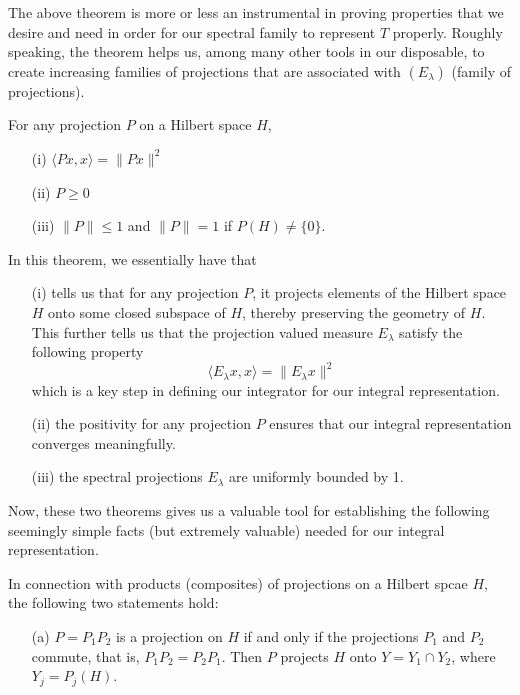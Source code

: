 The above theorem is more or less an instrumental in proving properties that we desire and need in order for our spectral family to represent \( T  \) properly. Roughly speaking, the theorem helps us, among many other tools in our disposable, to create increasing families of projections that are associated with \( ({E}_{\lambda}) \) (family of projections).

\begin{theorem}\label{9.5-2} For any projection \( P  \) on a Hilbert space \( H  \), 
   \begin{enumerate}
       \item[(i)] \( \langle Px , x  \rangle = \|Px\|^{2} \)
        \item[(ii)] \( P \geq 0  \) 
        \item[(iii)] \( \|P\| \leq   1  \) and \( \|P\| = 1  \) if \( P(H) \neq \{ 0 \}  \).
   \end{enumerate}
\end{theorem}



In this theorem, we essentially have that 
\begin{enumerate}
    \item[(i)] tells us that for any projection \( P  \), it projects elements of the Hilbert space \( H  \) onto some closed subspace of \( H  \), thereby preserving the geometry of \( H  \). This further tells us that the projection valued measure \( {E}_{\lambda} \) satisfy the following property   
\[ \langle {E}_{\lambda} x  ,  x  \rangle = \|{E}_{\lambda}x \|^{2} \]
which is a key step in defining our integrator for our integral representation.
    \item[(ii)]  the positivity for any projection \( P  \) ensures that our integral representation converges meaningfully.
    \item[(iii)] the spectral projections \( {E}_{\lambda} \) are uniformly bounded by 1.
\end{enumerate}

Now, these two theorems gives us a valuable tool for establishing the following seemingly simple facts (but extremely valuable) needed for our integral representation.

\begin{theorem}\label{9.5-3}
    In connection with products (composites) of projections on a Hilbert spcae \( H  \), the following two statements hold:
    \begin{enumerate}
        \item[(a)] \( P = {P}_{1} {P}_{2} \) is a projection on \( H  \) if and only if the projections \( {P}_{1} \) and \( {P}_{2} \) commute, that is, \( {P}_{1} {P}_{2} = {P}_{2} {P}_{1} \). Then \( P \) projects \( H  \) onto \( Y = {Y}_{1} \cap {Y}_{2}  \), where \( {Y}_{j} = {P}_{j}(H) \).
    \end{enumerate}
\end{theorem}


